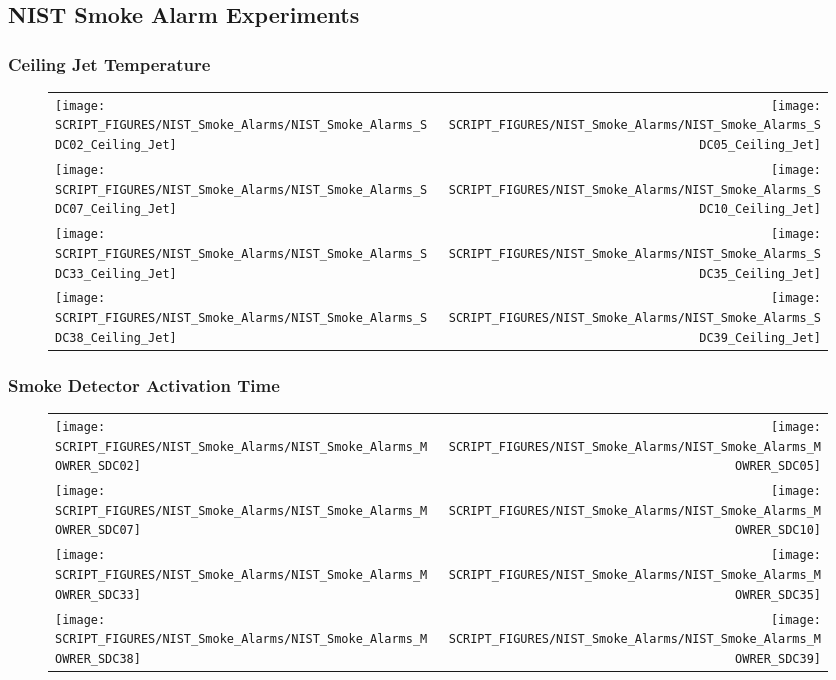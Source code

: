 \clearpage

\subsection{NIST Smoke Alarm Experiments}

\subsubsection{Ceiling Jet Temperature}

\begin{figure}[p]
\begin{tabular*}{\textwidth}{l@{\extracolsep{\fill}}r}
\texttt{[image: SCRIPT\_FIGURES/NIST\_Smoke\_Alarms/NIST\_Smoke\_Alarms\_SDC02\_Ceiling\_Jet]} &
\texttt{[image: SCRIPT\_FIGURES/NIST\_Smoke\_Alarms/NIST\_Smoke\_Alarms\_SDC05\_Ceiling\_Jet]} \\
\texttt{[image: SCRIPT\_FIGURES/NIST\_Smoke\_Alarms/NIST\_Smoke\_Alarms\_SDC07\_Ceiling\_Jet]} &
\texttt{[image: SCRIPT\_FIGURES/NIST\_Smoke\_Alarms/NIST\_Smoke\_Alarms\_SDC10\_Ceiling\_Jet]} \\
\texttt{[image: SCRIPT\_FIGURES/NIST\_Smoke\_Alarms/NIST\_Smoke\_Alarms\_SDC33\_Ceiling\_Jet]} &
\texttt{[image: SCRIPT\_FIGURES/NIST\_Smoke\_Alarms/NIST\_Smoke\_Alarms\_SDC35\_Ceiling\_Jet]} \\
\texttt{[image: SCRIPT\_FIGURES/NIST\_Smoke\_Alarms/NIST\_Smoke\_Alarms\_SDC38\_Ceiling\_Jet]} &
\texttt{[image: SCRIPT\_FIGURES/NIST\_Smoke\_Alarms/NIST\_Smoke\_Alarms\_SDC39\_Ceiling\_Jet]}
\end{tabular*}
\end{figure}

\clearpage

\subsubsection{Smoke Detector Activation Time}

\begin{figure}[p]
\begin{tabular*}{\textwidth}{l@{\extracolsep{\fill}}r}
\texttt{[image: SCRIPT\_FIGURES/NIST\_Smoke\_Alarms/NIST\_Smoke\_Alarms\_MOWRER\_SDC02]} &
\texttt{[image: SCRIPT\_FIGURES/NIST\_Smoke\_Alarms/NIST\_Smoke\_Alarms\_MOWRER\_SDC05]} \\
\texttt{[image: SCRIPT\_FIGURES/NIST\_Smoke\_Alarms/NIST\_Smoke\_Alarms\_MOWRER\_SDC07]} &
\texttt{[image: SCRIPT\_FIGURES/NIST\_Smoke\_Alarms/NIST\_Smoke\_Alarms\_MOWRER\_SDC10]} \\
\texttt{[image: SCRIPT\_FIGURES/NIST\_Smoke\_Alarms/NIST\_Smoke\_Alarms\_MOWRER\_SDC33]} &
\texttt{[image: SCRIPT\_FIGURES/NIST\_Smoke\_Alarms/NIST\_Smoke\_Alarms\_MOWRER\_SDC35]} \\
\texttt{[image: SCRIPT\_FIGURES/NIST\_Smoke\_Alarms/NIST\_Smoke\_Alarms\_MOWRER\_SDC38]} &
\texttt{[image: SCRIPT\_FIGURES/NIST\_Smoke\_Alarms/NIST\_Smoke\_Alarms\_MOWRER\_SDC39]}
\end{tabular*}
\end{figure}

